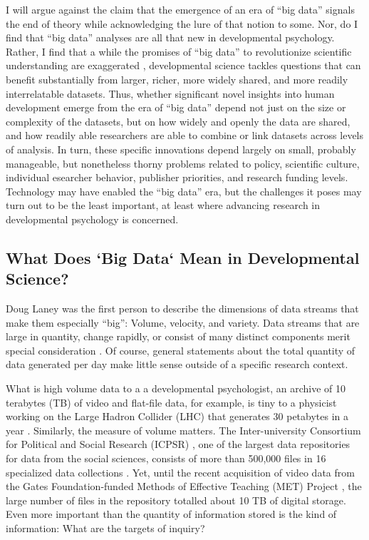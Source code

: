 \documentclass[letterpaper,man,apacite]{apa6}
\begin{document}
I will argue against the claim that the emergence of an era of ``big data'' signals the end of theory \cite{anderson_end_2008} while acknowledging the lure of that notion to some.
Nor, do I find that ``big data'' analyses are all that new in developmental psychology.
Rather, I find that a while the promises of ``big data'' to revolutionize scientific understanding are exaggerated \cite{boyd_critical_2012}, developmental science tackles questions that can benefit substantially from larger, richer, more widely shared, and more readily interrelatable datasets.
Thus, whether significant novel insights into human development emerge from the era of ``big data'' depend not just on the size or complexity of the datasets, but on how widely and openly the data are shared, and how readily able researchers are able to combine or link datasets across levels of analysis.
In turn, these specific innovations depend largely on small, probably manageable, but nonetheless thorny problems related to policy, scientific culture, individual esearcher behavior, publisher priorities, and research funding levels.
Technology may have enabled the ``big data'' era, but the challenges it poses may turn out to be the least important, at least where advancing research in developmental psychology is concerned.

 \subsection{What Does `Big Data` Mean in Developmental Science?}

Doug Laney \cite{laney01controlling3v} was the first person to describe the dimensions of data streams that make them especially ``big'': Volume, velocity, and variety.
Data streams that are large in quantity, change rapidly, or consist of many distinct components merit special consideration \cite{ibm_2015}.
Of course, general statements about the total quantity of data generated per day \cite{ibm_2015} make little sense outside of a specific research context.

What is high volume data to a a developmental psychologist, an archive of 10 terabytes (TB) of video and flat-file data, for example, is tiny to a physicist working on the Large Hadron Collider (LHC) that generates 30 petabytes in a year \cite{CERN_LHC}.
Similarly, the measure of volume matters.
The Inter-university Consortium for Political and Social Research (ICPSR) \cite{ICSPR}, one of the largest data repositories for data from the social sciences, consists of more than 500,000 files in 16 specialized data collections \cite{ICPSR}.
Yet, until the recent acquisition of video data from the Gates Foundation-funded Methods of Effective Teaching (MET) Project \cite{METProject}, the large number of files in the repository totalled about 10 TB of digital storage.
Even more important than the quantity of information stored is the kind of information: What are the targets of inquiry?
\end{document}
